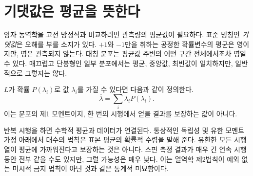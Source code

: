 \begin{classroomqa}\end{classroomqa}

\section{기댓값은 평균을 뜻한다}

양자 동역학을 고전 방정식과 비교하려면 관측량의 평균값이 필요하다. 표준 명칭인 \emph{기댓값}은 오해를 부를 소지가 있다. \(+1\)와 \(-1\)만을 취하는 공정한 확률변수의 평균은 영이지만, 영은 관측되지 않는다. 대칭 분포는 평균값 주변의 어떤 구간 전체에서조차 영일 수 있다. 매끄럽고 단봉형인 일부 분포에서는 평균, 중앙값, 최빈값이 일치하지만, 일반적으로 그렇지는 않다.

\(L\)가 확률 \(P(\lambda_i)\)로 값 \(\lambda_i\)를 가질 수 있다면 다음과 같이 정의한다. \begin{equation}
\overline{\lambda}=\sum_i\lambda_iP(\lambda_i).
\label{eq:l4-probability-average}
\end{equation}이는 분포의 제1 모멘트이지, 한 번의 시행에서 얻을 결과를 보장하는 값이 아니다.

\begin{classroomqa}\end{classroomqa}

반복 시행을 하면 수학적 평균과 데이터가 연결된다. 통상적인 독립성 및 유한 모멘트 가정 아래에서 대수의 법칙은 표본 평균의 확률적 수렴을 말해 준다. 유한한 모든 시행열이 평균에 가까워진다고 보장하는 것은 아니다. 스핀 측정 결과가 매우 긴 연속 시행 동안 전부 같을 수도 있지만, 그럴 가능성은 매우 낮다. 이는 열역학 제2법칙이 예외 없는 미시적 금지 법칙이 아닌 것과 같은 통계적 미묘함이다.

\begin{classroomqa}\end{classroomqa}

